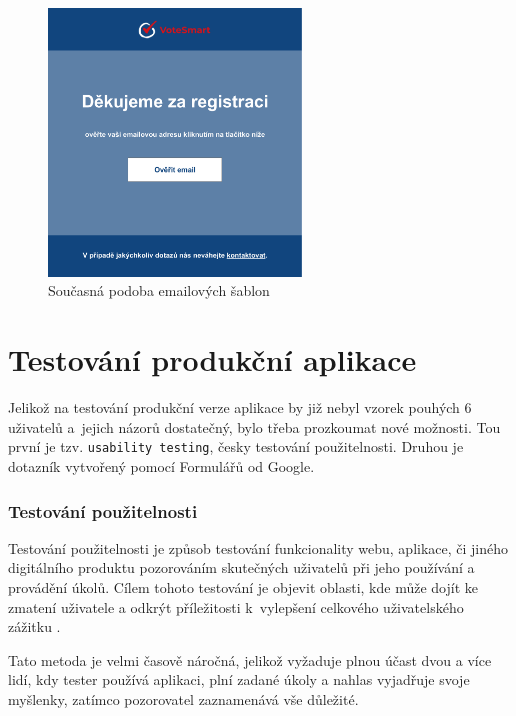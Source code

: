 \begin{figure}
    \centering
    \includegraphics[width=0.6\textwidth]{obrazky-figures/Email.pdf}
    \caption{Současná podoba emailových šablon}
    \label{fig:graphic-email}
\end{figure}

\section{Testování produkční aplikace}
Jelikož na testování produkční verze aplikace by již nebyl vzorek pouhých 6 uživatelů a~jejich názorů dostatečný, bylo třeba prozkoumat nové možnosti. Tou první je tzv. \texttt{usability testing}, česky testování použitelnosti. Druhou je dotazník vytvořený pomocí Formulářů od Google.

\subsubsection{Testování použitelnosti}
Testování použitelnosti je způsob testování funkcionality webu, aplikace, či jiného digitálního produktu pozorováním skutečných uživatelů při jeho používání a provádění úkolů. Cílem tohoto testování je objevit oblasti, kde může dojít ke zmatení uživatele a odkrýt příležitosti k~vylepšení celkového uživatelského zážitku \cite{hotjar-usability-testing}. 
\par Tato metoda je velmi časově náročná, jelikož vyžaduje plnou účast dvou a více lidí, kdy tester používá aplikaci, plní zadané úkoly a nahlas vyjadřuje svoje myšlenky, zatímco pozorovatel zaznamenává vše důležité.

